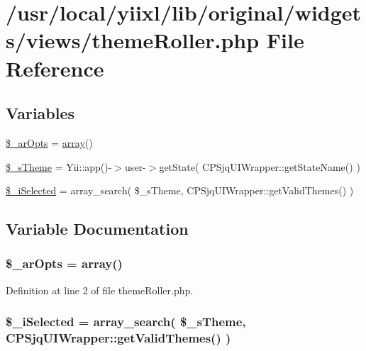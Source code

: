 \hypertarget{themeRoller_8php}{
\section{/usr/local/yiixl/lib/original/widgets/views/themeRoller.php File Reference}
\label{themeRoller_8php}
}
\subsection*{Variables}
\begin{DoxyCompactItemize}
\item 
\hyperlink{themeRoller_8php_ad6e41e6da579a605bb979b745aa3a612}{\$\_\-arOpts} = \hyperlink{list_8php_aa3205d038c7f8feb5c9f01ac4dfadc88}{array}()
\item 
\hyperlink{themeRoller_8php_a720977afada196d223efa00a1dc85976}{\$\_\-sTheme} = Yii::app()-\/$>$user-\/$>$getState( CPSjqUIWrapper::getStateName() )
\item 
\hyperlink{themeRoller_8php_a0171d96531bfd9e8f2ced82e7dc8334b}{\$\_\-iSelected} = array\_\-search( \$\_\-sTheme, CPSjqUIWrapper::getValidThemes() )
\end{DoxyCompactItemize}


\subsection{Variable Documentation}
\hypertarget{themeRoller_8php_ad6e41e6da579a605bb979b745aa3a612}{
\subsubsection[{\$\_\-arOpts}]{\setlength{\rightskip}{0pt plus 5cm}\$\_\-arOpts = {\bf array}()}}
\label{themeRoller_8php_ad6e41e6da579a605bb979b745aa3a612}


Definition at line 2 of file themeRoller.php.

\hypertarget{themeRoller_8php_a0171d96531bfd9e8f2ced82e7dc8334b}{
\subsubsection[{\$\_\-iSelected}]{\setlength{\rightskip}{0pt plus 5cm}\$\_\-iSelected = array\_\-search( \$\_\-sTheme, CPSjqUIWrapper::getValidThemes() )}}
\label{themeRoller_8php_a0171d96531bfd9e8f2ced82e7dc8334b}


